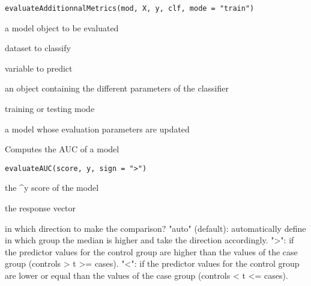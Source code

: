 \documentclass[a4paper]{book}
\begin{document}
%
\begin{Usage}
\begin{verbatim}
evaluateAdditionnalMetrics(mod, X, y, clf, mode = "train")
\end{verbatim}
\end{Usage}
%
\begin{Arguments}
\begin{ldescription}
\item[\code{mod:}] a model object to be evaluated

\item[\code{X:}] dataset to classify

\item[\code{y:}] variable to predict

\item[\code{clf:}] an object containing the different parameters of the classifier

\item[\code{mode:}] training or testing mode
\end{ldescription}
\end{Arguments}
%
\begin{Value}
a model whose evaluation parameters are updated
\end{Value}
%
\begin{Description}
Computes the AUC of a model
\end{Description}
%
\begin{Usage}
\begin{verbatim}
evaluateAUC(score, y, sign = ">")
\end{verbatim}
\end{Usage}
%
\begin{Arguments}
\begin{ldescription}
\item[\code{score:}] the \textasciicircum{}y score of the model

\item[\code{y:}] the response vector

\item[\code{sign:}] in which direction to make the comparison? "auto" (default): automatically define in which group 
the median is higher and take the direction accordingly. ">": if the predictor values for the control group 
are higher than the values of the case group (controls > t >= cases). "<": if the predictor values for the 
control group are lower or equal than the values of the case group (controls < t <= cases).
\end{ldescription}
\end{Arguments}
\end{document}
